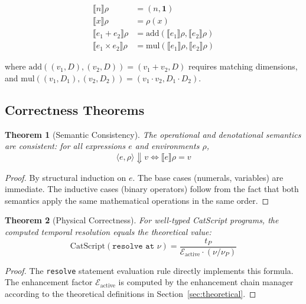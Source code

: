 \documentclass[twocolumn,10pt]{article}
\newtheorem{theorem}{Theorem}[section]
\begin{document}
\begin{align}
    \llbracket n \rrbracket \rho &= (n, \mathbf{1}) \\
    \llbracket x \rrbracket \rho &= \rho(x) \\
    \llbracket e_1 + e_2 \rrbracket \rho &= \text{add}(\llbracket e_1 \rrbracket \rho, \llbracket e_2 \rrbracket \rho) \\
    \llbracket e_1 \times e_2 \rrbracket \rho &= \text{mul}(\llbracket e_1 \rrbracket \rho, \llbracket e_2 \rrbracket \rho)
\end{align}

where $\text{add}((v_1, D), (v_2, D)) = (v_1 + v_2, D)$ requires matching dimensions, and $\text{mul}((v_1, D_1), (v_2, D_2)) = (v_1 \cdot v_2, D_1 \cdot D_2)$.

\subsection{Correctness Theorems}

\begin{theorem}[Semantic Consistency]
The operational and denotational semantics are consistent: for all expressions $e$ and environments $\rho$,
\begin{equation}
    \langle e, \rho \rangle \Downarrow v \iff \llbracket e \rrbracket \rho = v
\end{equation}
\end{theorem}

\begin{proof}
By structural induction on $e$. The base cases (numerals, variables) are immediate. The inductive cases (binary operators) follow from the fact that both semantics apply the same mathematical operations in the same order.
\end{proof}

\begin{theorem}[Physical Correctness]
For well-typed CatScript programs, the computed temporal resolution equals the theoretical value:
\begin{equation}
    \text{CatScript}(\texttt{resolve at } \nu) = \frac{t_P}{\mathcal{E}_{\text{active}} \cdot (\nu/\nu_P)}
\end{equation}
\end{theorem}

\begin{proof}
The \texttt{resolve} statement evaluation rule directly implements this formula. The enhancement factor $\mathcal{E}_{\text{active}}$ is computed by the enhancement chain manager according to the theoretical definitions in Section~\ref{sec:theoretical}.
\end{proof}
\end{document}
